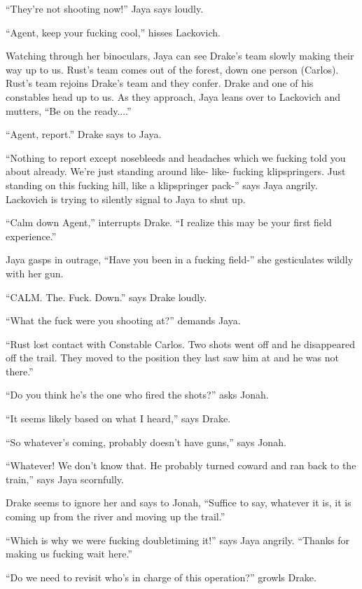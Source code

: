 ``They're not shooting now!'' Jaya says loudly.

``Agent, keep your fucking cool,'' hisses Lackovich.

 

Watching through her binoculars, Jaya can see Drake's team slowly making their way up to us.  Rust's team comes out of the forest, down one person (Carlos).  Rust's team rejoins Drake's team and they confer.  Drake and one of his constables head up to us.  As they approach, Jaya leans over to Lackovich and mutters, ``Be on the ready....''

``Agent, report.'' Drake says to Jaya.

``Nothing to report except nosebleeds and headaches which we fucking told you about already.  We're just standing around like- like- fucking klipspringers.  Just standing on this fucking hill, like a klipspringer pack-'' says Jaya angrily.  Lackovich is trying to silently signal to Jaya to shut up.

``Calm down Agent,'' interrupts Drake.  ``I realize this may be your first field experience.''

Jaya gasps in outrage,  ``Have you been in a fucking field-'' she gesticulates wildly with her gun.

``CALM.  The. Fuck. Down.'' says Drake loudly.

``What the fuck were you shooting at?'' demands Jaya.

``Rust lost contact with Constable Carlos.  Two shots went off and he disappeared off the trail. They moved to the position they last saw him at and he was not there.''

``Do you think he's the one who fired the shots?'' asks Jonah.

``It seems likely based on what I heard,'' says Drake.

``So whatever's coming, probably doesn't have guns,'' says Jonah.

``Whatever!  We don't know that.  He probably turned coward and ran back to the train,'' says Jaya scornfully.

Drake seems to ignore her and says to Jonah, ``Suffice to say, whatever it is, it is coming up from the river and moving up the trail.''

``Which is why we were fucking doubletiming it!'' says Jaya angrily.  ``Thanks for making us fucking wait here.''

``Do we need to revisit who's in charge of this operation?'' growls Drake.

